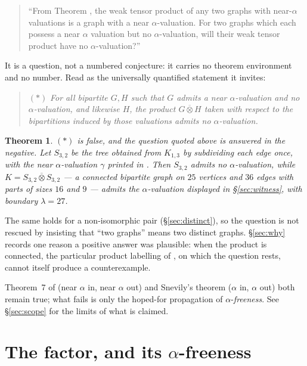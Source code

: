 \documentclass[11pt]{amsart}
\newtheorem{theorem}{Theorem}
\theoremstyle{definition}
\theoremstyle{remark}
\newcommand{\wtp}{\mathbin{\overline{\otimes}}}
\begin{document}
\begin{quote}
``From Theorem \cite[Thm.~7]{EKV}, the weak tensor product of any two
graphs with near-$\alpha$ valuations is a graph with a near $\alpha$-valuation.
For two graphs which each possess a near $\alpha$ valuation but no
$\alpha$-valuation, will their weak tensor product have no $\alpha$-valuation?''
\end{quote}

It is a question, not a numbered conjecture: it carries no theorem environment
and no number. Read as the universally quantified statement it invites:

\begin{quote}
$(\ast)$ \emph{For all bipartite $G,H$ such that $G$ admits a near
$\alpha$-valuation and no $\alpha$-valuation, and likewise $H$, the product
$G\wtp H$ taken with respect to the bipartitions induced by those valuations
admits no $\alpha$-valuation.}
\end{quote}

\begin{theorem}\label{thm:main}
$(\ast)$ is false, and the question quoted above is answered in the
negative. Let $S_{3,2}$ be the tree obtained from $K_{1,3}$ by subdividing each
edge once, with the near $\alpha$-valuation $\gamma$ printed in
\textup{\cite{AHM}}. Then $S_{3,2}$ admits no $\alpha$-valuation, while
$K=S_{3,2}\wtp S_{3,2}$ --- a connected bipartite graph on $25$ vertices and
$36$ edges with parts of sizes $16$ and $9$ --- admits the $\alpha$-valuation
displayed in \S\ref{sec:witness}, with boundary $\lambda=27$.
\end{theorem}

The same holds for a non-isomorphic pair (\S\ref{sec:distinct}), so the
question is not rescued by insisting that ``two graphs'' means two distinct
graphs. \S\ref{sec:why} records one reason a positive answer was plausible: when
the product is connected, the particular product labelling of \cite{EKV}, on
which the question rests, cannot itself produce a counterexample.

Theorem~7 of \cite{EKV} (near $\alpha$ in, near $\alpha$ out) and Snevily's
theorem \cite{Snevily} ($\alpha$ in, $\alpha$ out) both remain true; what fails
is only the hoped-for propagation of $\alpha$-\emph{freeness}. See
\S\ref{sec:scope} for the limits of what is claimed.

\section{The factor, and its $\alpha$-freeness}\label{sec:factor}
\end{document}
